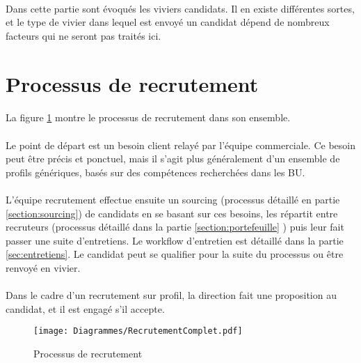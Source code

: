  \paragraph{} Dans cette partie sont évoqués les viviers candidats. Il en existe différentes sortes, et le type de vivier dans lequel est envoyé un candidat dépend de nombreux facteurs qui ne seront pas traités ici.

 \section{Processus de recrutement}
\label{section:recrutFull}
\paragraph{} La figure \ref{recrutementFull} montre le processus de recrutement dans son ensemble.
\paragraph{} Le point de départ est un besoin client relayé par l'équipe commerciale. Ce besoin peut être précis et ponctuel, mais il s'agit plus généralement d'un ensemble de profils génériques, basés sur des compétences recherchées dans les BU.
\paragraph{} L'équipe recrutement effectue ensuite un sourcing (processus détaillé en partie \ref{section:sourcing}) de candidats en se basant sur ces besoins, les répartit entre recruteurs (processus détaillé dans la partie \ref{section:portefeuille} ) puis leur fait passer une suite d'entretiens. Le workflow d'entretien est détaillé dans la partie \ref{sec:entretiens}. Le candidat peut se qualifier pour la suite du processus ou être renvoyé en vivier.
\paragraph{} Dans le cadre d'un recrutement sur profil, la direction fait une proposition au candidat, et il est engagé s'il accepte.
\begin{figure}
	\centering
	\begin{sideways}
	\texttt{[image: Diagrammes/RecrutementComplet.pdf]}
	\end{sideways}
	\caption{Processus de recrutement}
	\label{recrutementFull}	
\end{figure}


